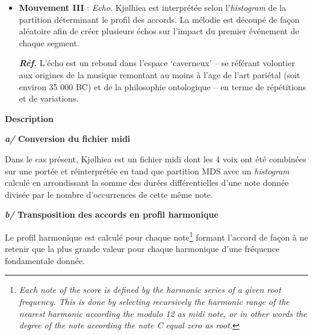 \begin{itemize}[leftmargin=0.4in]
\item \textbf{Mouvement III} : \textit{Echo}. Kj{\o}lhiea est interpr\'et\'ee selon l'\textsl{histogram} de la partition d\'eterminant le profil des accords. La m\'elodie est d\'ecoup\'e de fa\c con al\'eatoire afin de cr\'eer plusieurs \'echos sur l'impact du premier \'ev\'enement de chaque segment.

\textbf{\textit{R\'ef.}} L'\'echo est un rebond dans l'espace `caverneux' -- se r\'ef\'erant volontier aux origines de la musique remontant au moins \`a l'age de l'art pari\'etal (soit environ 35 000 BC) et de la philosophie ontologique -- en terme de r\'ep\'etitions et de variations. 
\end{itemize}

%
%
%

\smallskip

\noindent \textbf{{\large Description}}
\hrulefill

\bigskip

  \textbf{\textit{a/ } Conversion du fichier midi}
  
  \smallskip
  Dans le cas pr\'esent, Kj{\o}lhiea est un fichier midi dont les 4 voix ont \'et\'e combin\'ees sur une port\'ee et r\'einterpr\'et\'ee en tand que partition MDS avec un \textsl{histogram} calcul\'e en arrondissant la somme des dur\'ees  diff\'erentielles d'une note donn\'ee divis\'ee par le nombre d'occurrences de cette m\^eme note.

  \bigskip

  \textbf{\textit{b/ } Transposition des accords en profil harmonique }
  
  \smallskip

Le profil harmonique est calcul\'e pour chaque note\footnote{\textit{Each note of the}  \textsl{score}  \textit{is defined by the harmonic series of a given root frequency. This is done by selecting recursively the harmonic range of the nearest harmonic according the modulo 12 as midi note, or in other words the degree of the note according the note C equal zero as root.}} 
formant l'accord de fa\c con \`a ne retenir que la plus grande valeur pour chaque harmonique d'une fr\'equence fondamentale donn\'ee.

